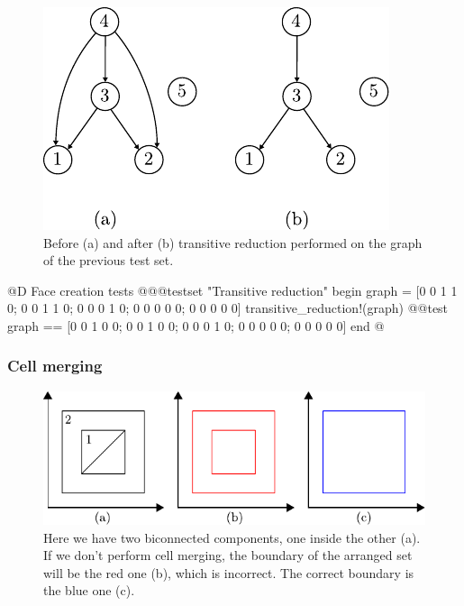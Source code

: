 \begin{figure}[h]
    \centering
    \includegraphics{./img/ch2-transitivered.pdf}
    \caption{Before (a) and after (b) transitive reduction performed on
    the graph of the previous test set.}
\end{figure}

@D Face creation tests
@{@@testset "Transitive reduction" begin
    graph = [0 0 1 1 0; 0 0 1 1 0; 0 0 0 1 0; 0 0 0 0 0; 0 0 0 0 0]
    transitive_reduction!(graph)
    @@test graph == [0 0 1 0 0; 0 0 1 0 0; 0 0 0 1 0; 0 0 0 0 0; 0 0 0 0 0]
end
@}

\subsubsection{Cell merging}

\begin{figure}[h]
    \centering
    \includegraphics{./img/ch2-cellmerge.pdf}
    \caption{Here we have two biconnected components, one inside the other (a).
    If we don't perform cell merging, the boundary of the arranged set will be
    the red one (b), which is incorrect. The correct boundary is the blue one (c).}
\end{figure}


